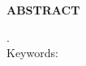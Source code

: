 \begin{center}
\textbf{ABSTRACT}
\end{center}

\singlespacing

\noindent . \\

\noindent Keywords:

